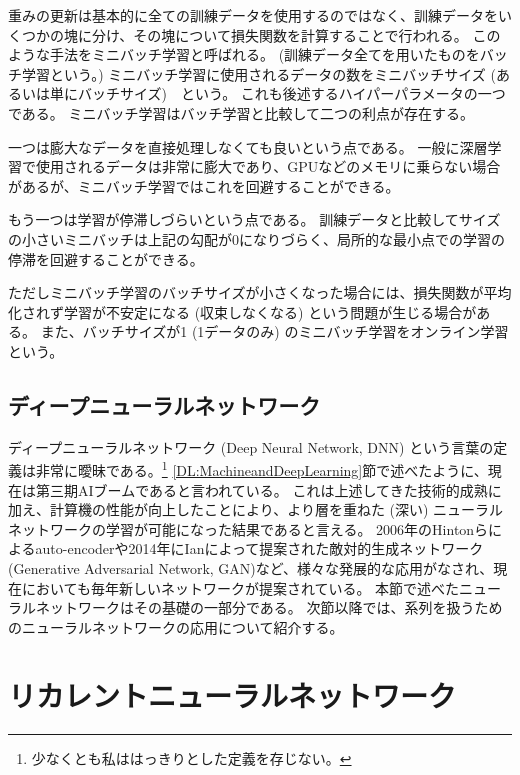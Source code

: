 重みの更新は基本的に全ての訓練データを使用するのではなく、訓練データをいくつかの塊に分け、その塊について損失関数を計算することで行われる。
このような手法をミニバッチ学習と呼ばれる。
(訓練データ全てを用いたものをバッチ学習という。)
ミニバッチ学習に使用されるデータの数をミニバッチサイズ (あるいは単にバッチサイズ)　という。
これも後述するハイパーパラメータの一つである。
ミニバッチ学習はバッチ学習と比較して二つの利点が存在する。

一つは膨大なデータを直接処理しなくても良いという点である。
一般に深層学習で使用されるデータは非常に膨大であり、GPUなどのメモリに乗らない場合があるが、ミニバッチ学習ではこれを回避することができる。

もう一つは学習が停滞しづらいという点である。
訓練データと比較してサイズの小さいミニバッチは上記の勾配が0になりづらく、局所的な最小点での学習の停滞を回避することができる。

ただしミニバッチ学習のバッチサイズが小さくなった場合には、損失関数が平均化されず学習が不安定になる (収束しなくなる) という問題が生じる場合がある。
また、バッチサイズが1 (1データのみ) のミニバッチ学習をオンライン学習という。


\subsection{ディープニューラルネットワーク} \label{DL:NN:DeepNeuralNetwork}

ディープニューラルネットワーク (Deep Neural Network, DNN) という言葉の定義は非常に曖昧である。\footnote{少なくとも私ははっきりとした定義を存じない。}
\ref{DL:MachineandDeepLearning}節で述べたように、現在は第三期AIブームであると言われている。
これは上述してきた技術的成熟に加え、計算機の性能が向上したことにより、より層を重ねた (深い) ニューラルネットワークの学習が可能になった結果であると言える。
2006年のHintonらによるauto-encoder\cite{Autoencoder}や2014年にIanによって提案された敵対的生成ネットワーク (Generative Adversarial Network, GAN\cite{GenerativeAdversarialNetworks})など、様々な発展的な応用がなされ、現在においても毎年新しいネットワークが提案されている。
本節で述べたニューラルネットワークはその基礎の一部分である。
次節以降では、系列を扱うためのニューラルネットワークの応用について紹介する。


\section{リカレントニューラルネットワーク} \label{DL:RecurrentNeuralNetwork}

